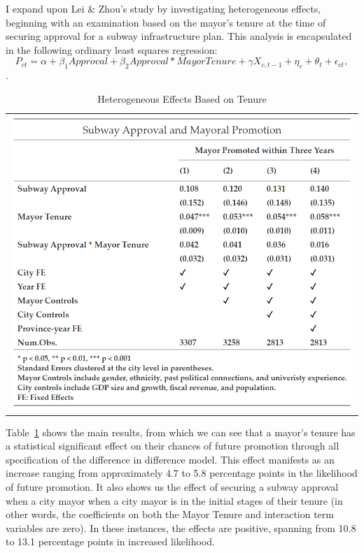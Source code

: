 \documentclass[12pt, ]{article}
\begin{document}
I expand upon Lei \& Zhou's study by investigating heterogeneous
effects, beginning with an examination based on the mayor's tenure at
the time of securing approval for a subway infrastructure plan. This
analysis is encapsulated in the following ordinary least squares
regression:
\[P_{ct} = \alpha + \beta_{1}Approval + \beta_{2}Approval * Mayor Tenure + \gamma X_{c,t - 1} + \eta_{c} + \theta_{t} + \epsilon_{ct},\].

\hypertarget{tbl-extension2}{}
\begin{longtable}[]{@{}l@{}}
\caption{\label{tbl-extension2}Heterogeneous Effects Based on
Tenure}\tabularnewline
\toprule\noalign{}
\endfirsthead
\endhead
\bottomrule\noalign{}
\endlastfoot
\includegraphics{tables/extension_tenure.png} \\
\end{longtable}

Table~\ref{tbl-extension2} shows the main results, from which we can see
that a mayor's tenure has a statistical significant effect on their
chances of future promotion through all specification of the difference
in difference model. This effect manifests as an increase ranging from
approximately 4.7 to 5.8 percentage points in the likelihood of future
promotion. It also shows us the effect of securing a subway approval
when a city mayor when a city mayor is in the initial stages of their
tenure (in other words, the coefficients on both the Mayor Tenure and
interaction term variables are zero). In these instances, the effects
are positive, spanning from 10.8 to 13.1 percentage points in increased
likelihood.
\end{document}
